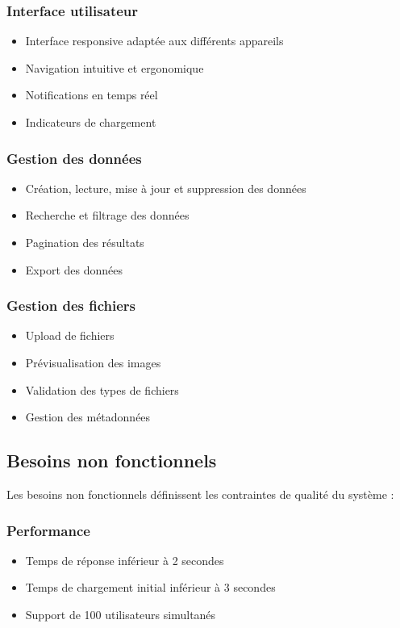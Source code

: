 \subsubsection{Interface utilisateur}
\begin{itemize}
    \item Interface responsive adaptée aux différents appareils
    \item Navigation intuitive et ergonomique
    \item Notifications en temps réel
    \item Indicateurs de chargement
\end{itemize}

\subsubsection{Gestion des données}
\begin{itemize}
    \item Création, lecture, mise à jour et suppression des données
    \item Recherche et filtrage des données
    \item Pagination des résultats
    \item Export des données
\end{itemize}

\subsubsection{Gestion des fichiers}
\begin{itemize}
    \item Upload de fichiers
    \item Prévisualisation des images
    \item Validation des types de fichiers
    \item Gestion des métadonnées
\end{itemize}

\subsection{Besoins non fonctionnels}

Les besoins non fonctionnels définissent les contraintes de qualité du système :

\subsubsection{Performance}
\begin{itemize}
    \item Temps de réponse inférieur à 2 secondes
    \item Temps de chargement initial inférieur à 3 secondes
    \item Support de 100 utilisateurs simultanés
\end{itemize}

